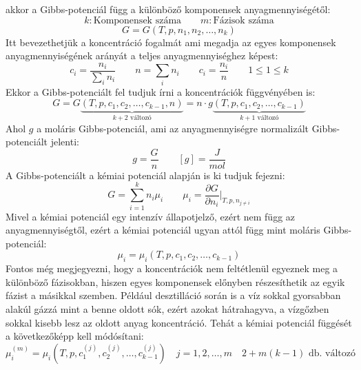 \documentclass[a4paper,12pt]{article}
\begin{document}
akkor a Gibbs-potenciál függ a különböző komponensek anyagmennyiségétől:
\begin{equation}
    k: \text{Komponensek száma} \qquad m: \text{Fázisok száma}
\end{equation}
\begin{equation}
    G = G(T, p, n_1, n_2, \ldots, n_k)
\end{equation}
Itt bevezethetjük a koncentráció fogalmát ami megadja az egyes komponensek anyagmennyiségének arányát a teljes anyagmennyiséghez képest:
\begin{equation}
    c_i = \frac{n_i}{\sum_i n_i} \qquad n = \sum_i n_i \qquad c_i = \frac{n_i}{n} \qquad 1 \leq 1 \leq k
\end{equation}
Ekkor a Gibbs-potenciált fel tudjuk írni a koncentrációk függvényében is:
\begin{equation}
    G = G \underbrace{(T, p, c_1, c_2, \ldots, c_{k-1}, n)}_{k + 2 \text{ változó}} = n \cdot g \underbrace{(T, p, c_1, c_2, \ldots, c_{k-1})}_{k + 1 \text{ változó}}
\end{equation}
Ahol $g$ a moláris Gibbs-potenciál, ami az anyagmennyiségre normalizált Gibbs-potenciált jelenti:
\begin{equation}
    g = \frac{G}{n} \qquad \left[g\right] = \frac{J}{mol}
\end{equation}
A Gibbs-potenciált a kémiai potenciál alapján is ki tudjuk fejezni:
\begin{equation}
    G = \sum_{i=1}^{k} n_i \mu_i \qquad \mu_i = \frac{\partial G}{\partial n_i}\bigg|_{T, p, n_{j \neq i}}
\end{equation}
Mivel a kémiai potenciál egy intenzív állapotjelző, ezért nem függ az anyagmennyiségtől, ezért a kémiai potenciál ugyan attól függ mint moláris Gibbs-potenciál:
\begin{equation}
    \mu_i = \mu_i (T, p, c_1, c_2, \ldots, c_{k-1})
\end{equation}
Fontos még megjegyezni, hogy a koncentrációk nem feltétlenül egyeznek meg a különböző fázisokban, hiszen egyes komponensek előnyben részesíthetik az egyik fázist a másikkal szemben.
Például desztilláció során is a víz sokkal gyorsabban alakúl gázzá mint a benne oldott sók, ezért azokat hátrahagyva, a vízgőzben sokkal kisebb lesz az oldott anyag koncentráció.
Tehát a kémiai potenciál függését a következőképp kell módósítani:
\begin{equation}
    \mu_i^{(m)} = \mu_i (T, p, c_1^{(j)}, c_2^{(j)}, \ldots, c_{k-1}^{(j)}) \quad j = 1, 2, \ldots, m \quad 2 + m(k - 1) \text{ db. változó}
\end{equation}
\end{document}
